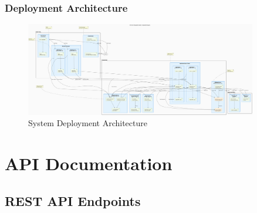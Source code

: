 \documentclass[12pt,a4paper]{article}
\begin{document}
\subsubsection{Deployment Architecture}

\begin{figure}[H]
\centering
\includegraphics[width=0.9\textwidth]{diagrams/deployment_diagram.png}
\caption{System Deployment Architecture}
\label{fig:deployment-diagram}
\end{figure}

\section{API Documentation}

\subsection{REST API Endpoints}
\end{document}
